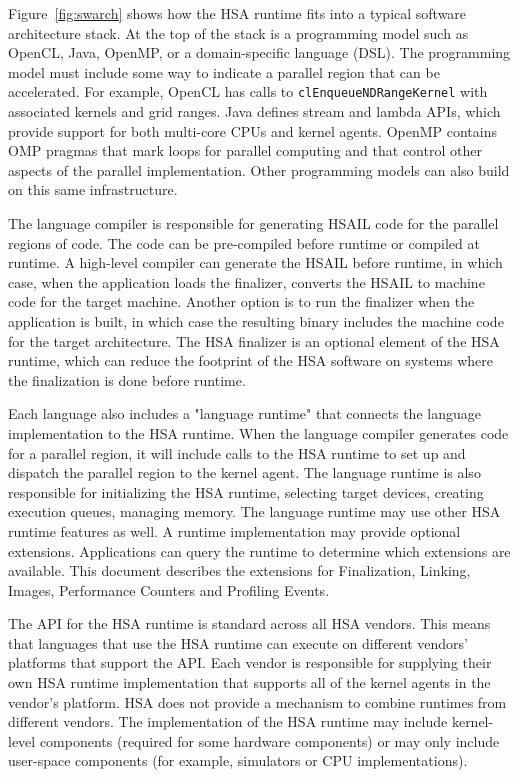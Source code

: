 \documentclass[oneside]{book}
\begin{document}
Figure~\ref{fig:swarch} shows how the HSA runtime fits into a typical software
architecture stack. At the top of the stack is a programming model such as
OpenCL\texttrademark, Java, OpenMP, or a domain-specific language (DSL). The
programming model must include some way to indicate a parallel region that can
be accelerated. For example, OpenCL has calls to \texttt{clEnqueueNDRangeKernel}
with associated kernels and grid ranges. Java defines stream and lambda APIs,
which provide support for both multi-core CPUs and kernel agents. OpenMP
contains OMP pragmas that mark loops for parallel computing and that control
other aspects of the parallel implementation. Other programming models can also
build on this same infrastructure.

The language compiler is responsible for generating HSAIL code for the parallel
regions of code. The code can be pre-compiled before runtime or compiled at
runtime. A high-level compiler can generate the HSAIL before runtime, in which
case, when the application loads the finalizer, converts the HSAIL to machine
code for the target machine. Another option is to run the finalizer when the
application is built, in which case the resulting binary includes the machine
code for the target architecture. The HSA finalizer is an optional element of
the HSA runtime, which can reduce the footprint of the HSA software on systems
where the finalization is done before runtime.

Each language also includes a "language runtime" that connects the language
implementation to the HSA runtime. When the language compiler generates code for
a parallel region, it will include calls to the HSA runtime to set up and
dispatch the parallel region to the kernel agent. The language runtime is also
responsible for initializing the HSA runtime, selecting target devices, creating
execution queues, managing memory. The language runtime may use other HSA
runtime features as well. A runtime implementation may provide optional
extensions. Applications can query the runtime to determine which extensions are
available. This document describes the extensions for Finalization, Linking,
Images, Performance Counters and Profiling Events.

The API for the HSA runtime is standard across all HSA vendors. This means that
languages that use the HSA runtime can execute on different vendors' platforms
that support the API. Each vendor is responsible for supplying their own HSA
runtime implementation that supports all of the kernel agents in the vendor's
platform. HSA does not provide a mechanism to combine runtimes from different
vendors. The implementation of the HSA runtime may include kernel-level
components (required for some hardware components) or may only include
user-space components (for example, simulators or CPU implementations).
\end{document}
